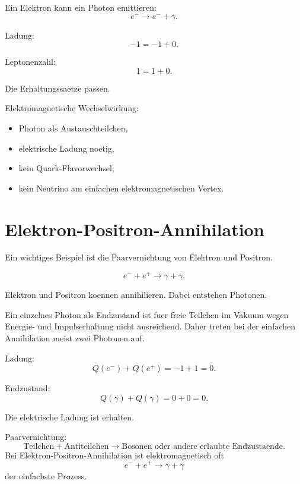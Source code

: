 \begin{examplebox}
Ein Elektron kann ein Photon emittieren:
\[
    e^- \rightarrow e^- + \gamma.
\]

Ladung:
\[
    -1 = -1 + 0.
\]

Leptonenzahl:
\[
    1 = 1 + 0.
\]

Die Erhaltungssaetze passen.
\end{examplebox}

\begin{examtipbox}
Elektromagnetische Wechselwirkung:
\begin{itemize}
    \item Photon als Austauschteilchen,
    \item elektrische Ladung noetig,
    \item kein Quark-Flavorwechsel,
    \item kein Neutrino am einfachen elektromagnetischen Vertex.
\end{itemize}
\end{examtipbox}

\section{Elektron-Positron-Annihilation}

Ein wichtiges Beispiel ist die Paarvernichtung von Elektron und Positron.

\begin{formulabox}
\[
    e^- + e^+ \rightarrow \gamma + \gamma.
\]
\end{formulabox}

\begin{conceptbox}
Elektron und Positron koennen annihilieren.
Dabei entstehen Photonen.

Ein einzelnes Photon als Endzustand ist fuer freie Teilchen im Vakuum wegen
Energie- und Impulserhaltung nicht ausreichend.
Daher treten bei der einfachen Annihilation meist zwei Photonen auf.
\end{conceptbox}

\begin{examplebox}
Ladung:
\[
    Q(e^-)+Q(e^+)
    =
    -1+1
    =
    0.
\]

Endzustand:
\[
    Q(\gamma)+Q(\gamma)=0+0=0.
\]

Die elektrische Ladung ist erhalten.
\end{examplebox}

\begin{examtipbox}
Paarvernichtung:
\[
    \text{Teilchen}+\text{Antiteilchen}
    \rightarrow
    \text{Bosonen oder andere erlaubte Endzustaende}.
\]
Bei Elektron-Positron-Annihilation ist elektromagnetisch oft
\[
    e^-+e^+\rightarrow \gamma+\gamma
\]
der einfachste Prozess.
\end{examtipbox}

